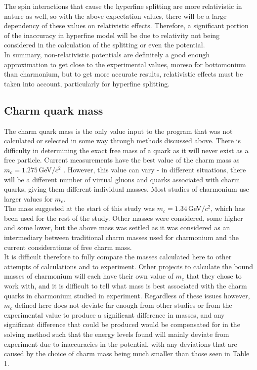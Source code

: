 \documentclass[10pt, twocolumn]{article}
\begin{document}
The spin interactions that cause the hyperfine splitting are more relativistic in nature as well, so with the above expectation values, there will be a large dependency of these values on relativistic effects.
Therefore, a significant portion of the inaccuracy in hyperfine model will be due to relativity not being considered in the calculation of the splitting or even the potential. \\
In summary, non-relativistic potentials are definitely a good enough approximation to get close to the experimental values, moreso for bottomonium than charmonium, but to get more accurate results, relativistic effects must be taken into account, particularly for hyperfine splitting. 

\subsection{Charm quark mass}
The charm quark mass is the only value input to the program that was not calculated or selected in some way through methods discussed above. 
There is difficulty in determining the exact free mass of a quark as it will never exist as a free particle. 
Current measurements have the best value of the charm mass as $m_c = 1.275\,$GeV$/c^2$ \cite{10}.
However, this value can vary - in different situations, there will be a different number of virtual gluons and quarks associated with charm quarks, giving them different individual masses. 
Most studies of charmonium use larger values for $m_c$. \\
The mass suggested at the start of this study was $m_c = 1.34\,$GeV$/c^2$\cite{11}, which has been used for the rest of the study. 
Other masses were considered, some higher and some lower, but the above mass was settled as it was considered as an intermediary between traditional charm masses used for charmonium and the current considerations of free charm mass. \\
It is difficult therefore to fully compare the masses calculated here to other attempts of calculations and to experiment. 
Other projects to calculate the bound masses of charmonium will each have their own value of $m_c$ that they chose to work with, and it is difficult to tell what mass is best associated with the charm quarks in charmonium studied in experiment. 
Regardless of these issues however, $m_c$ defined here does not deviate far enough from other studies or from the experimental value to produce a significant difference in masses, and any significant difference that could be produced would be compensated for in the solving method such that the energy levels found will mainly deviate from experiment due to inaccuracies in the potential, with any deviations that are caused by the choice of charm mass being much smaller than those seen in Table 1.
\end{document}
